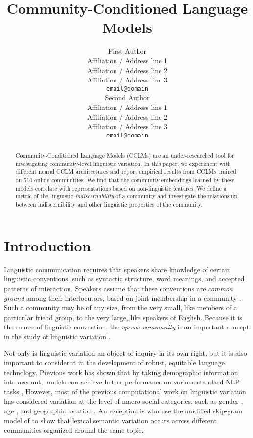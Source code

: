 \documentclass[11pt]{article}
\title{Community-Conditioned Language Models}
\author{First Author \\
  Affiliation / Address line 1 \\
  Affiliation / Address line 2 \\
  Affiliation / Address line 3 \\
  \texttt{email@domain} \\\And
  Second Author \\
  Affiliation / Address line 1 \\
  Affiliation / Address line 2 \\
  Affiliation / Address line 3 \\
  \texttt{email@domain} \\}
\date{}
\begin{document}
\maketitle
\begin{abstract}
  Community-Conditioned Language Models (CCLMs) are an under-researched tool for 
  investigating community-level linguistic variation.
  In this paper, we experiment with different neural CCLM architectures and
  report empirical results from CCLMs trained on 510 online communities.
  We find that the community embeddings learned by these models
  correlate with representations based on non-linguistic features.
  We define a metric of the linguistic \emph{indiscernability} of a community
  and investigate the relationship between indiscernibility and other
  linguistic properties of the community.
\end{abstract}

\section{Introduction}
Linguistic communication requires that speakers share
knowledge of certain linguistic conventions, such as syntactic
structure, word meanings, and accepted patterns of interaction.
Speakers assume that these conventions are \emph{common ground} among
their interlocutors, based on joint membership in a community
\cite{Stalnaker2002, Clark1996}.  Such a community may be of any size,
from the very small, like members of a particular friend group, to the
very large, like speakers of English.  Because it is the source of
linguistic convention, the \emph{speech community} is an important
concept in the study of linguistic variation \citep{Gumperz1972}.

Not only is linguistic variation an object of inquiry in its own
right, but it is also important to consider it in the development of
robust, equitable language technology.  Previous work has shown that
by taking demographic information into account, models can achieve
better performance on various standard NLP tasks
\citep{Hovy2015,Yang2017}, 
%
However, most of the previous computational work on linguistic variation 
has considered variation at the level of macro-social categories, such as gender
\citep{Burger2011,Ciot2013,Bamman2014}, age \citep{Nguyen2013}, and
geographic location \citep{Eisenstein2010,Bamman2014a}.
An exception is \citet{DelTredici2017} who use the modified
skip-gram model of \citet{Bamman2014a} to show that lexical semantic
variation occurs across different communities organized around the
same topic.
\end{document}
